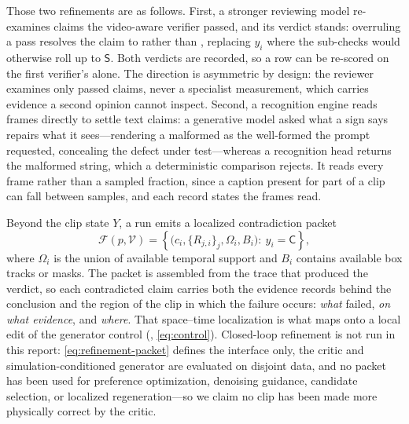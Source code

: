 Those two refinements are as follows. First, a stronger reviewing model re-examines claims the video-aware verifier passed, and its verdict stands\label{sec:review}: overruling a pass resolves the claim to \contradicted{} rather than \unknownv{}, replacing $y_i$ where the sub-checks would otherwise roll up to $\mathsf{S}$. Both verdicts are recorded, so a row can be re-scored on the first verifier's alone. The direction is asymmetric by design: the reviewer examines only passed claims, never a specialist measurement, which carries evidence a second opinion cannot inspect. Second, a recognition engine reads frames directly to settle text claims: a generative model asked what a sign says repairs what it sees---rendering a malformed  as the well-formed  the prompt requested, concealing the defect under test---whereas a recognition head returns the malformed string, which a deterministic comparison rejects. It reads every frame rather than a sampled fraction, since a caption present for part of a clip can fall between samples, and each record states the frames read.

Beyond the clip state $Y$, a run emits a localized contradiction packet\label{sec:loop}
\begin{equation}
\mathcal{F}(p,\mathcal V)
=
\left\{
\bigl(c_i,\{R_{j,i}\}_j,\Omega_i,B_i\bigr)
:\ y_i=\mathsf{C}
\right\},
\label{eq:refinement-packet}
\end{equation}
where $\Omega_i$ is the union of available temporal support and $B_i$ contains available box
tracks or masks. The packet is assembled from the trace that produced the verdict, so each
contradicted claim carries both the evidence records behind the conclusion and the region of
the clip in which the failure occurs: \emph{what} failed, \emph{on what evidence}, and
\emph{where}. That space--time localization is what  maps onto a local edit
of the generator control (, \eqref{eq:control}).
Closed-loop refinement is not run in this report: \cref{eq:refinement-packet} defines the
interface only, the critic and simulation-conditioned generator are evaluated on disjoint data,
and no \PhyReAct{} packet has been used for preference optimization, denoising guidance, candidate
selection, or localized regeneration---so we claim no clip has been made more physically correct
by the critic.
